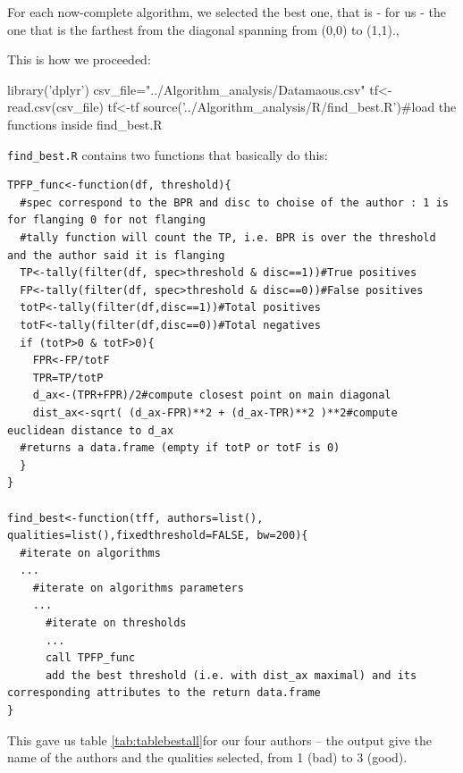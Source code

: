 \documentclass{article}\usepackage[]{graphicx}\usepackage[]{color}
\begin{document}
For each now-complete algorithm, we selected the best one, that is - for us - the one that is the farthest from the diagonal spanning from (0,0) to (1,1).,

This is how we proceeded:

\begin{Schunk}
\begin{Sinput}
library('dplyr')
csv_file="../Algorithm_analysis/Datamaous.csv"
tf<-read.csv(csv_file)
tf<-tf %
source('../Algorithm_analysis/R/find_best.R')#load the functions inside find_best.R
\end{Sinput}
\end{Schunk}

{\tt find{\_}best.R} contains two functions that basically do this:

\begin{lstlisting}[style=Rstyle, caption={\tt find{\_}best.R},label=code:findbest]
TPFP_func<-function(df, threshold){
  #spec correspond to the BPR and disc to choise of the author : 1 is for flanging 0 for not flanging
  #tally function will count the TP, i.e. BPR is over the threshold and the author said it is flanging
  TP<-tally(filter(df, spec>threshold & disc==1))#True positives
  FP<-tally(filter(df, spec>threshold & disc==0))#False positives
  totP<-tally(filter(df,disc==1))#Total positives
  totF<-tally(filter(df,disc==0))#Total negatives
  if (totP>0 & totF>0){
    FPR<-FP/totF
    TPR=TP/totP
    d_ax<-(TPR+FPR)/2#compute closest point on main diagonal
    dist_ax<-sqrt( (d_ax-FPR)**2 + (d_ax-TPR)**2 )**2#compute euclidean distance to d_ax
  #returns a data.frame (empty if totP or totF is 0)
  }
}

find_best<-function(tff, authors=list(), qualities=list(),fixedthreshold=FALSE, bw=200){
  #iterate on algorithms
  ...
    #iterate on algorithms parameters
    ...
      #iterate on thresholds
      ...
      call TPFP_func
      add the best threshold (i.e. with dist_ax maximal) and its corresponding attributes to the return data.frame
}
\end{lstlisting}

This gave us table \ref{tab:tablebestall}for our four authors -- the output give the name of the authors and the qualities selected, from 1 (bad) to 3 (good).
\end{document}
